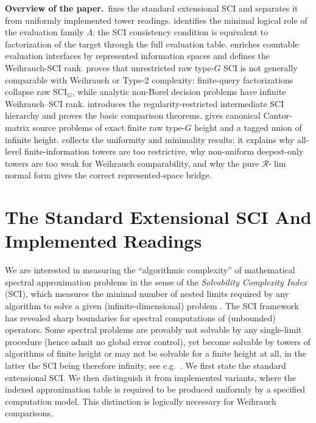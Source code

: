 \documentclass{lmcs} %
\theoremstyle{plain}
\theoremstyle{plain}
\theoremstyle{definition}
\theoremstyle{remark}
\theoremstyle{definition}
\theoremstyle{remark}
\numberwithin{equation}{section}
\newcommand{\Lim}{\operatorname{lim}}
\newcommand{\SCIG}{\mathrm{SCI}_G}
\begin{document}
\textbf{Overview of the paper.}$\,$
 fixes the standard extensional SCI and separates it from uniformly
implemented tower readings.  identifies the minimal logical role of the
evaluation family \(\Lambda\): the SCI consistency condition is equivalent to
factorization of the target through the full evaluation table.  enriches
countable evaluation interfaces by represented information spaces and defines the
Weihrauch-SCI rank.  proves that unrestricted raw type-\(G\) SCI is not
generally comparable with Weihrauch or Type-2 complexity: finite-query factorizations
collapse raw \(\SCIG\), while analytic non-Borel decision problems have infinite
Weihrauch--SCI rank.  introduces the regularity-restricted intermediate SCI
hierarchy and proves the basic comparison theorems.  gives canonical
Cantor-matrix source problems of exact finite raw type-\(G\) height and a tagged union
of infinite height.  collects the uniformity and minimality results: it explains
why all-level finite-information towers are too restrictive, why non-uniform
deepest-only towers are too weak for Weihrauch comparability, and why the pure
\(\mathcal R\)-\(\Lim\) normal form gives the correct represented-space bridge.

\section{The Standard Extensional SCI And Implemented Readings}{\label{sec:SCIdef}}

We are interested in measuring the \enquote{algorithmic complexity} of mathematical spectral approximation problems in the sense of the \textit{Solvability Complexity Index} (SCI), which measures the minimal number of nested limits required by any algorithm to solve a given (infinite-dimensional) problem \cite{hansen2011solvability,ben2015computing,ben2015new,ColbrookHansen22}. The SCI framework has revealed sharp boundaries for spectral computations of (unbounded) operators. Some spectral problems are provably not solvable by any single-limit procedure (hence admit no global error control), yet become solvable by towers of algorithms of finite height or may not be solvable for a finite height at all, in the latter the SCI being therefore infinity, see e.g.\ \cite[Theorem B.1]{colbrook2024limits}. We first state the standard extensional SCI. We then distinguish it from implemented variants, where the indexed approximation table is required to be produced uniformly by a specified computation model. This distinction is logically necessary for Weihrauch comparisons.
\end{document}
